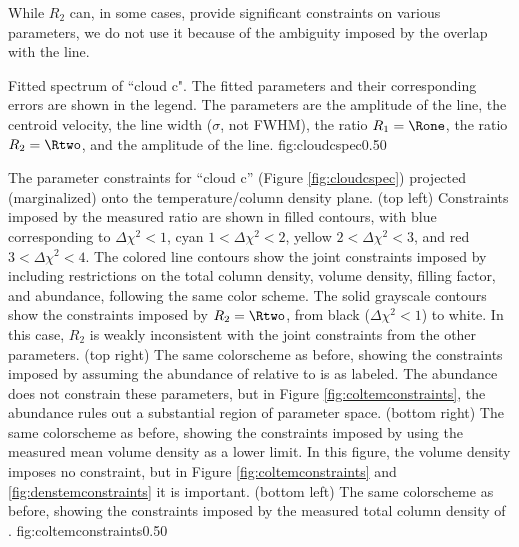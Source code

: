 While $R_2$ can, in some cases, provide significant constraints on various
parameters, we do not use it because of the ambiguity imposed by the overlap
with the \methanol \fourtwotwo line.



{Fitted spectrum of ``cloud c".  The fitted parameters and their corresponding
errors are shown in the legend.  The parameters are the amplitude of the
\formaldehyde \threeohthree line, the centroid velocity, the line width
($\sigma$, not FWHM), the ratio $R_1 = \Rone$,
the ratio $R_2 = \Rtwo$, and the amplitude of
the \methanol \fourtwotwo line.  }
{fig:cloudcspec}{0.5}{0}

{The parameter constraints for ``cloud c'' (Figure \ref{fig:cloudcspec})
projected (marginalized) onto the temperature/column density plane.\newline
(top left) Constraints imposed by the measured ratio \Rone are shown in filled contours,
with blue corresponding to $\Delta\chi^2 < 1$, cyan $1 < \Delta\chi^2 < 2$,
yellow $2 < \Delta\chi^2 < 3$, and red $3 < \Delta\chi^2 < 4$.  The colored line
contours show the joint constraints imposed by including restrictions on the
total column density, volume density,  filling factor, and abundance, following
the same color
scheme.  The solid grayscale contours show the constraints imposed by
$R_2=\Rtwo$, from black ($\Delta\chi^2 < 1$) to white.  In this case, $R_2$
is weakly inconsistent with the joint constraints from the other parameters.
\newline
(top right) The same colorscheme as before, showing the constraints imposed by
assuming the abundance of \para relative to \hh is as labeled.  
The abundance does not constrain these parameters, but in Figure
\ref{fig:coltemconstraints}, the abundance rules out a substantial region of parameter
space.
\newline
(bottom right) The same colorscheme as before, showing the constraints imposed
by using the measured mean volume density as a lower limit.  In this figure,
the volume density imposes no constraint, but in Figure \ref{fig:coltemconstraints}
and \ref{fig:denstemconstraints} it is important.
\newline
(bottom left) The same colorscheme as before, showing the constraints imposed
by the measured total column density of \hh.
}
{fig:coltemconstraints}{0.5}{0}

